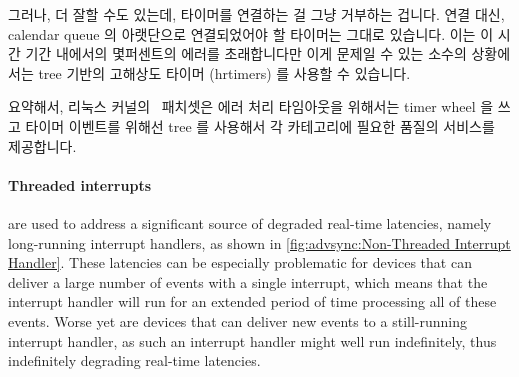 \fi

그러나, 더 잘할 수도 있는데, 타이머를 연결하는 걸 그냥 거부하는 겁니다.
연결 대신, calendar queue 의 아랫단으로 연결되었어야 할 타이머는 그대로
있습니다.
이는 이 시간 기간 내에서의 몇퍼센트의 에러를 초래합니다만 이게 문제일 수 있는
소수의 상황에서는 tree 기반의 고해상도 타이머 (hrtimers) 를 사용할 수 있습니다.

요약해서, 리눅스 커널의 \rt\ 패치셋은 에러 처리 타임아웃을 위해서는 timer wheel
을 쓰고 타이머 이벤트를 위해선 tree 를 사용해서 각 카테고리에 필요한 품질의
서비스를 제공합니다.

\paragraph{Threaded interrupts}
are used to address a significant source of degraded real-time latencies,
namely long-running interrupt handlers,
as shown in \cref{fig:advsync:Non-Threaded Interrupt Handler}.
These latencies can be especially problematic for devices that can
deliver a large number of events with a single interrupt, which means
that the interrupt handler will run for an extended period of time
processing all of these events.
Worse yet are devices that can deliver new events to a still-running
interrupt handler, as such an interrupt handler might well run
indefinitely, thus indefinitely degrading real-time latencies.

